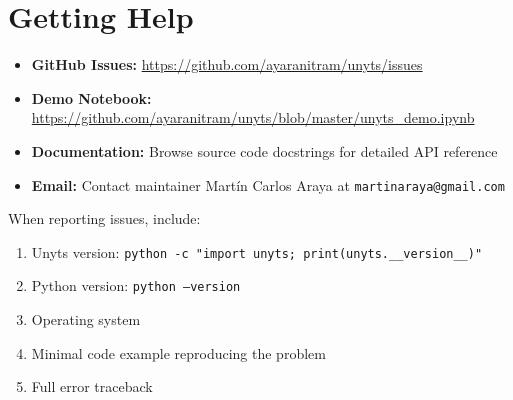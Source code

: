 \documentclass[11pt,a4paper]{report}
\begin{document}
\section{Getting Help}

\begin{itemize}
\item \textbf{GitHub Issues:} \url{https://github.com/ayaranitram/unyts/issues}
\item \textbf{Demo Notebook:} \url{https://github.com/ayaranitram/unyts/blob/master/unyts_demo.ipynb}
\item \textbf{Documentation:} Browse source code docstrings for detailed API reference
\item \textbf{Email:} Contact maintainer Martín Carlos Araya at \texttt{martinaraya@gmail.com}
\end{itemize}

When reporting issues, include:
\begin{enumerate}
\item Unyts version: \texttt{python -c "import unyts; print(unyts.\_\_version\_\_)"}
\item Python version: \texttt{python --version}
\item Operating system
\item Minimal code example reproducing the problem
\item Full error traceback
\end{enumerate}
\end{document}
